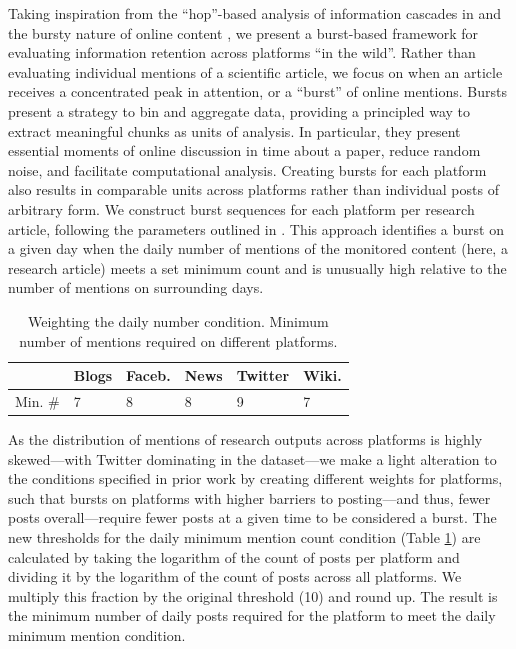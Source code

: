 \documentclass[letterpaper]{article} %
\begin{document}
Taking inspiration from the ``hop''-based analysis of information cascades in \citet{ribeiroMessageDistortionInformation2019} and the bursty nature of online content \citep{zakhlebinDiffusionScientificArticles2020,gilbertWidespreadUnderprovisionReddit2013,chengCascadesRecur2016}, we present a burst-based framework for evaluating information retention across platforms ``in the wild''. 
Rather than evaluating individual mentions of a scientific article, we focus on when an article receives a concentrated peak in attention, or a ``burst'' of online mentions. Bursts present a strategy to bin and aggregate data, providing a principled way to extract meaningful chunks as units of analysis.
In particular, they present essential moments of online discussion in time about a paper, reduce random noise, and facilitate computational analysis. Creating bursts for each platform also results in comparable units across platforms rather than individual posts of arbitrary form. We construct burst sequences for each platform per research article, following the parameters outlined in \citet{chengCascadesRecur2016}. This approach identifies a burst on a given day when the daily number of mentions of the monitored content (here, a research article) meets a set minimum count and is unusually high relative to the number of mentions on surrounding days.

\begin{table}[t]
    \centering
    \begin{tabular}{r|l|l|l|l|l}
    & \textbf{Blogs} & \textbf{Faceb.} & \textbf{News} & \textbf{Twitter} & \textbf{Wiki.} \\
    \hline
    Min. \# & 7 & 8 & 8 & 9 & 7 \\
    \end{tabular}
    \caption{Weighting the daily number condition. Minimum number of mentions required on different platforms.}
    \label{tab:condition_1_weights}
\end{table}

As the distribution of mentions of research outputs across platforms is highly skewed---with Twitter dominating in the dataset---we make a light alteration to the conditions specified in prior work \citep{chengCascadesRecur2016} by creating different weights for platforms, such that bursts on platforms with higher barriers to posting---and thus, fewer posts overall---require fewer posts at a given time to be considered a burst. %
The new thresholds for the daily minimum mention count condition (Table \ref{tab:condition_1_weights}) are calculated by taking the logarithm of the count of posts per platform and dividing it by the logarithm of the count of posts across all platforms. We multiply this fraction by the original threshold (10) and round up. The result is the minimum number of daily posts required for the platform to meet the daily minimum mention condition.
\end{document}
